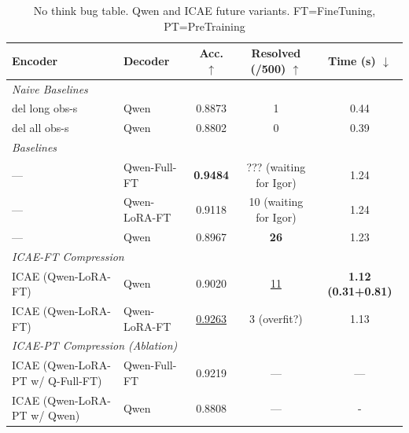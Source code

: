 \begin{table}[h]
  \centering
  \small
  \setlength{\tabcolsep}{4pt}

  \begin{tabular}{|ll|ccc|}
      \hline
      \textbf{Encoder} & \textbf{Decoder} & \textbf{Acc. $\uparrow$} & \textbf{Resolved (/500) $\uparrow$} & \textbf{Time (s) $\downarrow$} \\
      \hline
      \multicolumn{5}{|l|}{\hspace{1em}\textit{Naive Baselines}} \\
      \hline
      del long obs-s            & Qwen           & 0.8873 & 1         & 0.44                      \\
      del all obs-s             & Qwen           & 0.8802 & 0         & 0.39                      \\
      \hline
      \multicolumn{5}{|l|}{\hspace{1em}\textit{Baselines}} \\
      \hline
      —                         & Qwen-Full-FT   & \textbf{0.9484} & ??? (waiting for Igor)         & 1.24                      \\
      —                         & Qwen-LoRA-FT   & 0.9118 & 10 (waiting for Igor)        & 1.24                      \\
      —                         & Qwen           & 0.8967 & \textbf{26}        & 1.23                      \\
      \hline
      \multicolumn{5}{|l|}{\hspace{1em}\textit{ICAE-FT Compression}} \\
      \hline
      ICAE (Qwen-LoRA-FT)       & Qwen           & 0.9020 & \underline{11}        & \textbf{1.12 (0.31+0.81)}    \\
      ICAE (Qwen-LoRA-FT)       & Qwen-LoRA-FT   & \underline{0.9263} & 3 (overfit?) & 1.13                      \\
      \hline
      \multicolumn{5}{|l|}{\hspace{1em}\textit{ICAE-PT Compression (Ablation)}} \\
      \hline
      ICAE (Qwen-LoRA-PT w/ Q-Full-FT) & Qwen-Full-FT   & 0.9219 & —         & —                         \\
      ICAE (Qwen-LoRA-PT w/ Qwen)      & Qwen           & 0.8808 & —         & -        \\
      \hline
  \end{tabular}
  \caption{No think bug table. Qwen and ICAE future variants. FT=FineTuning, PT=PreTraining}
  \label{tab:qwen_icae_variants_absolute}
\end{table}


